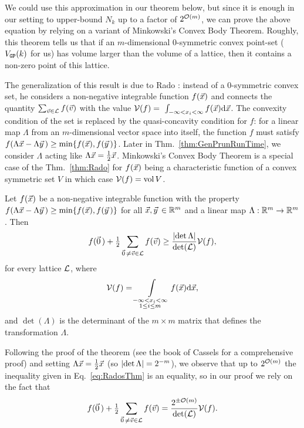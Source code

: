 We could use this approximation in our theorem below, but since it is enough in our setting to upper-bound $N_k$ up to a factor of $2^{\mathcal{O}(m)}$, we can prove the above equation by relying on a variant of Minkowski's Convex Body Theorem. 
Roughly, this theorem tells us that if an $m$-dimensional 0-symmetric convex point-set ($V_{\texttt{GP}}(k)$ for us) has volume larger than the volume of a lattice, then it contains a non-zero point of this lattice. 

The generalization of this result is due to Rado \cite{R46}: instead of a 0-symmetric convex set, he considers a non-negative integrable function $f(\vec x)$  and connects the quantity $\sum_{\vvec \in \Lat} f(\vvec)$ with the value $\mathcal{V}(f) =~ \int_{- \infty < x_i < \infty} f(\vec x) \mathrm{d} \vec x$. The convexity condition of the set is replaced by the quasi-concavity condition for $f$: for a linear map ${\Lambda}$ from an $m$-dimensional vector space into itself, the function $f$ must satisfy $f(\Lambda \xvec - \Lambda \yvec) \geq \min \{ f(\xvec), f(\yvec) \}$.
Later in Thm.~\ref{thm:GenPrunRunTime}, we consider $\Lambda$ acting like $\Lambda \vec x = \tfrac{1}{2} \vec x$. 
Minkowski's Convex Body Theorem is a special case of the Thm.~\ref{thm:Rado} for $f(\vec x)$ being a characteristic function of a convex symmetric set $V$ in which case $\mathcal{V}(f) = \operatorname{\mathrm{vol}} V$.

\begin{thm} \label{thm:Rado}
Let $f(\vec x)$ be a non-negative integrable function with the property $f(\Lambda \xvec - \Lambda \yvec) \geq \min \{ f(\xvec), f(\yvec) \}$ for all $\xvec, \yvec \in \R^m$ and a linear map $\Lambda: {{\mathbb R}}^m \rightarrow {{\mathbb R}}^m$. Then
\begin{equation} \label{eq:RadosThm}
	f(\zerovec) + \tfrac{1}{2} \sum_{\zerovec \neq \vvec \in \Lat} f(\vvec) \geq \frac{\abs{\det \Lambda}}{\det (\Lat)} \mathcal{V}(f),
\end{equation}
for every lattice $\mathcal{L}$, where 
\[
\mathcal{V}(f) = \int\limits_{\substack{ - \infty < x_i < \infty \\ 1 \leq i \leq m }} f(\vec x) \mathrm{d} \vec x,
\] 
and $\det(\Lambda)$ is the determinant of the $m \times m$ matrix that defines the transformation $\Lambda$.
\end{thm}
Following the proof of the theorem (see the book of Cassels \cite[Chap.\ III]{Cas97} for a comprehensive proof) and setting $\Lambda \vec x = \tfrac{1}{2} \vec x$ (so $\left|\det \Lambda\right| = 2^{-m}$), we observe that up to $2^{\mathcal{O}(m)}$ the inequality given in Eq.~\eqref{eq:RadosThm} is an equality, so in our proof we rely on the fact that
\begin{equation} \label{eq:RadoEq}
f(\zerovec) + \tfrac{1}{2} \sum_{\zerovec \neq \vvec \in \Lat} f(\vvec) = \frac{2^{\pm \bigO(m)}}{\det (\Lat)} \mathcal{V}(f).
\end{equation}

